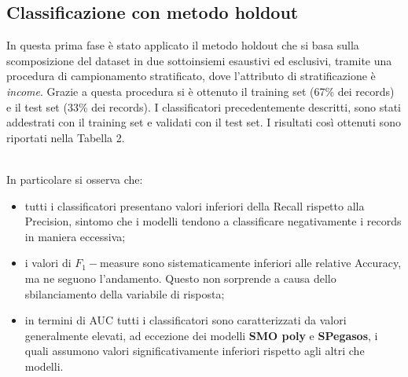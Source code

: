 \documentclass[fleqn,10pt]{SelfArx}
\begin{document}
\subsection{Classificazione con metodo holdout}
In questa prima fase è stato applicato il metodo holdout che si basa sulla scomposizione del dataset in due sottoinsiemi esaustivi ed esclusivi, tramite una procedura di campionamento stratificato, dove l'attributo di stratificazione è \textit{income}. Grazie a questa procedura si è ottenuto il training set (67\% dei records) e il test set (33\% dei records). I classificatori precedentemente descritti, sono stati addestrati con il training set e validati con il test set.
I risultati così ottenuti sono riportati nella Tabella 2.
\begin{table}[h!]
\caption{Classificatori con holdout}
\label{table:holdout}
\end{table}
\\
In particolare si osserva che:
\begin{itemize}
    \item tutti i classificatori presentano valori inferiori della Recall rispetto alla Precision, sintomo che i modelli tendono a classificare negativamente i records in maniera eccessiva;
    \item i valori di $F_1-$measure sono sistematicamente inferiori alle relative Accuracy, ma ne seguono l'andamento. Questo non sorprende a causa dello sbilanciamento della variabile di risposta;
    \item in termini di AUC tutti i classificatori sono caratterizzati da valori generalmente elevati, ad eccezione dei modelli \textbf{SMO poly} e \textbf{SPegasos}, i quali assumono valori significativamente inferiori rispetto agli altri che modelli.
\end{itemize}
\end{document}
